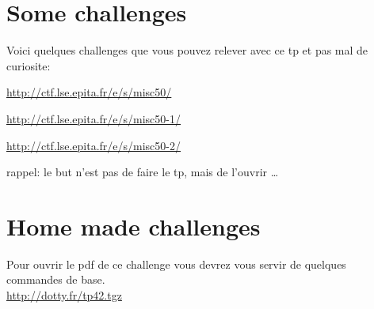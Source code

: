 \documentclass[a4paper]{article}
\begin{document}
\section{Some challenges}
Voici quelques challenges que vous pouvez relever avec ce tp et pas mal de
curiosite:



\url{http://ctf.lse.epita.fr/e/s/misc50/}

\url{http://ctf.lse.epita.fr/e/s/misc50-1/}

\url{http://ctf.lse.epita.fr/e/s/misc50-2/} \
\

rappel: le but n'est pas de faire le tp, mais de l'ouvrir \dots


\section{Home made challenges}

Pour ouvrir le pdf de ce challenge vous devrez vous servir de quelques commandes de base.\\


\url{http://dotty.fr/tp42.tgz}
\end{document}
